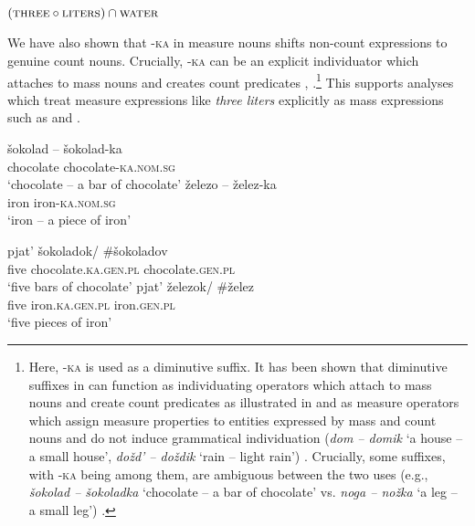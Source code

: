 \documentclass[output=paper]{langscibook}
\begin{document}
\ea\label{ex:khrizmann:41} $(\textsc{three}\circ\textsc{liters}) \cap\textsc{water}$
\z

\noindent We have also shown that -\textsc{ka} in measure nouns shifts non-count expressions to genuine count nouns. Crucially, -\textsc{ka} can be an explicit individuator which attaches to mass nouns and creates count predicates \citep{Khrizman2017} , .\footnote{Here, -\textsc{ka} is used as a diminutive suffix. It has been shown that diminutive suffixes in  can function as individuating operators which attach to mass nouns and create count predicates as illustrated in  and as measure operators which assign measure properties to entities expressed by mass and count nouns and do not induce grammatical individuation (\textit{dom -- domik} `a house -- a small house', \textit{\textit{dožd' -- doždik}} `rain -- light rain') \citep{Khrizman2017,Khrizman2019}. Crucially, some suffixes, with -\textsc{ka} being among them, are ambiguous between the two uses (e.g., \textit{šokolad -- šokoladka} `chocolate -- a bar of chocolate' vs. \textit{noga -- nožka} `a leg -- a small leg') \citep{Khrizman2019}.} This supports analyses which treat measure expressions like \textit{three liters} explicitly as mass expressions such as \citet{Khrizman.etal2015} and \citet{Landman2016}.

\begin{exe}
\ex\label{ex:khrizmann:42}
       \begin{xlist}
           \ex\label{ex:khrizmann:42a} \gll šokolad -- šokolad-ka\\
          chocolate {}{} chocolate-\textsc{ka.nom.sg}\\
\glt `chocolate -- a bar of chocolate'
          \ex\label{ex:khrizmann:42b} \gll železo -- želez-ka\\
            iron {}{} iron-\textsc{ka.nom.sg}\\
            \glt `iron -- a piece of iron'\\
        \end{xlist}
\end{exe}


\begin{exe}
\ex\label{ex:khrizmann:43}
       \begin{xlist}
            \ex\label{ex:khrizmann:43a} \gll pjat' šokoladok/ \#šokoladov\\
            five chocolate.\textsc{ka.gen.pl} \phantom{\#}chocolate.\textsc{gen.pl}\\
           \glt `five bars of chocolate'
           \ex\label{ex:khrizmann:43b} \gll pjat' železok/ \#želez\\
            five iron.\textsc{ka.gen.pl} \phantom{\#}iron.\textsc{gen.pl}\\
           \glt `five pieces of iron'\\
       \end{xlist}
\end{exe}
\end{document}
